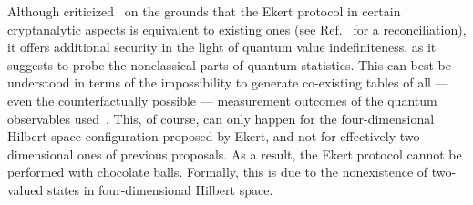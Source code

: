 \documentclass[12pt]{elsarticle}%
\begin{document}
Although criticized~\cite{PhysRevLett.68.557} on the grounds that the Ekert protocol
in certain cryptanalytic aspects is equivalent to existing ones
(see Ref.~\cite{benn-92b} for a reconciliation),
it offers additional security in the light of quantum value indefiniteness,
as it suggests to probe the nonclassical parts of quantum statistics.
This can best be understood in terms of the impossibility to generate
co-existing tables of all --- even the counterfactually possible --- measurement outcomes
of the quantum observables used~\cite{peres222}.
This, of course, can only happen for the four-dimensional Hilbert space configuration
proposed by Ekert,
and not for effectively two-dimensional ones of previous proposals.
As a result, the Ekert protocol cannot be performed with chocolate balls.
Formally, this is due to the nonexistence of two-valued states
in four-dimensional Hilbert space.
\end{document}
